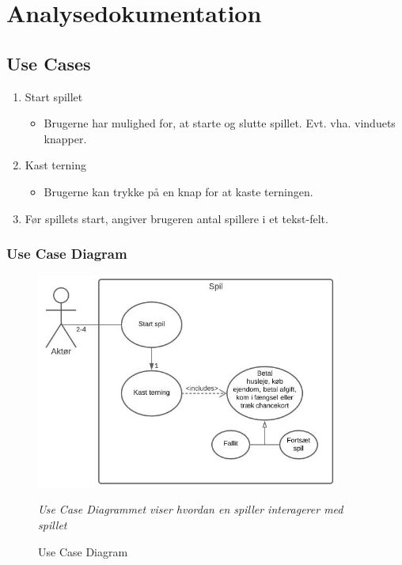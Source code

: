 \section{Analysedokumentation}
    \subsection{Use Cases}
        \begin{enumerate}
          \item Start spillet
        \begin{itemize}
          \item Brugerne har mulighed for, at starte og slutte spillet. Evt. vha. vinduets knapper.
        \end{itemize}
         \item Kast terning
        \begin{itemize}
           \item Brugerne kan trykke på en knap for at kaste terningen.
        \end{itemize}
         \item Før spillets start, angiver brugeren antal spillere i et tekst-felt.
        \end{enumerate}
        
        
        \subsubsection{Use Case Diagram}
        
        \begin{figure}[H]
            \centering
            \includegraphics[width=10cm]{figures/usecase.jpg}
            \caption{Use Case Diagram}
            \emph{ Use Case Diagrammet viser hvordan en spiller interagerer med spillet}
        \end{figure}
        
